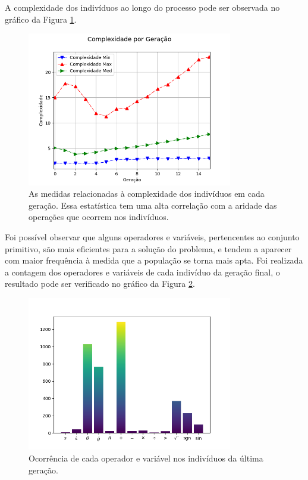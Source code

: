 A complexidade dos indivíduos ao longo do processo pode ser observada no gráfico da Figura \ref{fig:4ec-cartpolecompl}.

\begin{figure}[H]
	\centering
	\includegraphics[width=0.8\textwidth]{02_desenvolvimento/04_EC_Fig_CartpoleCompl.png}
	\caption{As medidas relacionadas à complexidade dos indivíduos em cada geração. Essa estatística tem uma alta correlação com a aridade das operações que ocorrem nos indivíduos.}
	\label{fig:4ec-cartpolecompl}
\end{figure}

Foi possível observar que alguns operadores e variáveis, pertencentes ao conjunto primitivo, são mais eficientes para a solução do problema, e tendem a aparecer com maior frequência à medida que a população se torna mais apta. Foi realizada a contagem dos operadores e variáveis de cada indivíduo da geração final, o resultado pode ser verificado no gráfico da Figura \ref{fig:4ec-cartpoleoper}.

\begin{figure}[H]
	\centering
	\includegraphics[width=0.8\textwidth]{02_desenvolvimento/04_EC_Fig_CartpoleOper.png}
	\caption{Ocorrência de cada operador e variável nos indivíduos da última geração.}
	\label{fig:4ec-cartpoleoper}
\end{figure}

